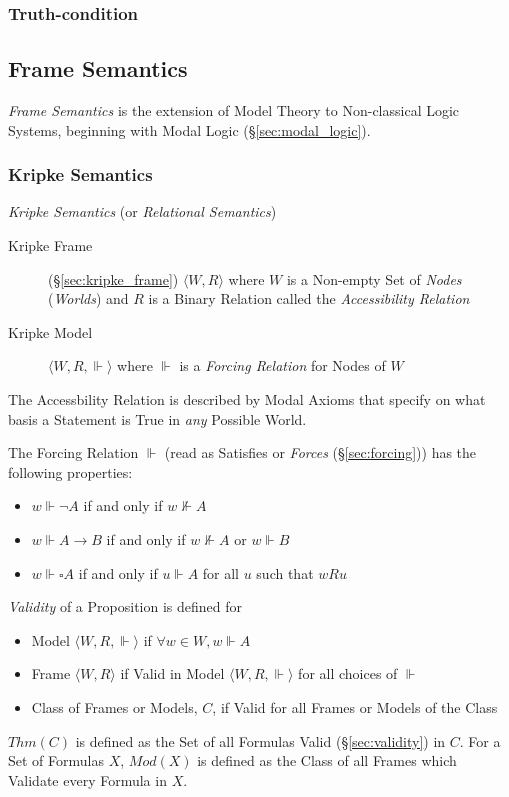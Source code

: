 \subsubsection{Truth-condition}\label{sec:truth_condition}



\subsection{Frame Semantics}\label{sec:frame_semantics}

\emph{Frame Semantics} is the extension of Model Theory to
Non-classical Logic Systems, beginning with Modal Logic
(\S\ref{sec:modal_logic}).



\subsubsection{Kripke Semantics}\label{sec:kripke_semantics}

\emph{Kripke Semantics} (or \emph{Relational Semantics})

\begin{description}
\item [Kripke Frame] (\S\ref{sec:kripke_frame}) $\langle W,R \rangle$
  where $W$ is a Non-empty Set of \emph{Nodes} (\emph{Worlds}) and $R$
  is a Binary Relation called the \emph{Accessibility Relation}
\item [Kripke Model] $\langle W,R,\Vdash \rangle$ where $\Vdash$ is a
  \emph{Forcing Relation} for Nodes of $W$
\end{description}
The Accessbility Relation is described by Modal Axioms that specify on
what basis a Statement is True in \emph{any} Possible World.

The Forcing Relation $\Vdash$ (read as Satisfies or \emph{Forces}
(\S\ref{sec:forcing})) has the following properties:
\begin{itemize}
\item $w \Vdash \neg A$ if and only if $w \nVdash A$
\item $w \Vdash A \rightarrow B$ if and only if $w \nVdash A$ or $w
  \Vdash B$
\item $w \Vdash \square A$ if and only if $u \Vdash A$ for all $u$
  such that $w R u$
\end{itemize}
\emph{Validity} of a Proposition is defined for
\begin{itemize}
\item Model $\langle W,R, \Vdash \rangle$ if $\forall w \in W,
  w \Vdash A$
\item Frame $\langle W,R \rangle$ if Valid in Model $\langle W,R,
  \Vdash \rangle$ for all choices of $\Vdash$
\item Class of Frames or Models, $C$, if Valid for all Frames or
  Models of the Class
\end{itemize}
$Thm(C)$ is defined as the Set of all Formulas Valid
(\S\ref{sec:validity}) in $C$. For a Set of Formulas $X$,
$Mod(X)$ is defined as the Class of all Frames which Validate every
Formula in $X$.

